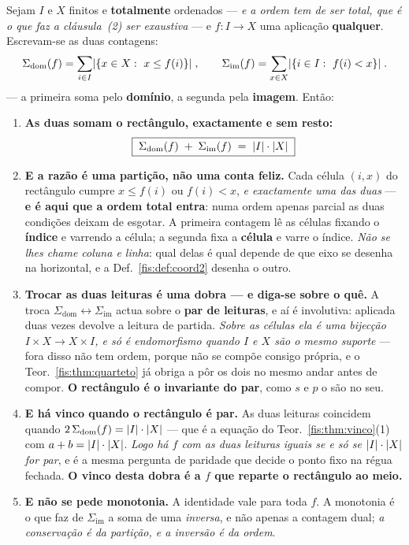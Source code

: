 \documentclass[livro.tex]{subfiles}
\begin{document}
\begin{teorema}\label{fis:thm:central}
Sejam $I$ e $X$ finitos e \textbf{totalmente} ordenados --- \emph{e a ordem tem
de ser total, que é o que faz a cláusula~(2) ser exaustiva} --- e
$f\colon I\to X$ uma aplicação \textbf{qualquer}. Escrevam-se as duas contagens:
\[
\Sigma_{\mathrm{dom}}(f)=\sum_{i\in I}\abs{\{x\in X:\ x\le f(i)\}}\;,
\qquad
\Sigma_{\mathrm{im}}(f)=\sum_{x\in X}\abs{\{i\in I:\ f(i)<x\}}\;.
\]
--- a primeira soma pelo \textbf{domínio}, a segunda pela \textbf{imagem}.
Então:
\begin{enumerate}\itemsep3pt
\item[(1)] \textbf{As duas somam o rectângulo, exactamente e sem resto:}
\[
\boxed{\;\Sigma_{\mathrm{dom}}(f)\;+\;\Sigma_{\mathrm{im}}(f)\;=\;\lvert I\rvert\cdot\lvert X\rvert\;}
\]
\item[(2)] \textbf{E a razão é uma partição, não uma conta feliz.} Cada célula
$(i,x)$ do rectângulo cumpre $x\le f(i)$ ou $f(i)<x$, \emph{e exactamente uma
das duas} --- \textbf{e é aqui que a ordem total entra}: numa ordem apenas
parcial as duas condições deixam de esgotar. A primeira contagem lê as células
fixando o \textbf{índice} e varrendo a célula; a segunda fixa a \textbf{célula} e
varre o índice. \emph{Não se lhes chame coluna e linha}: qual delas é qual depende
de que eixo se desenha na horizontal, e a Def.~\ref{fis:def:coord2} desenha o
outro.
\item[(3)] \textbf{Trocar as duas leituras é uma dobra --- e diga-se sobre o
quê.} A troca $\Sigma_{\mathrm{dom}}\leftrightarrow\Sigma_{\mathrm{im}}$ actua
sobre o \textbf{par de leituras}, e aí é involutiva: aplicada duas vezes devolve
a leitura de partida. \emph{Sobre as células ela é uma bijecção
$I\times X\to X\times I$, e só é endomorfismo quando $I$ e $X$ são o mesmo
suporte} --- fora disso não tem ordem, porque não se compõe consigo própria,
e o Teor.~\ref{fis:thm:quarteto} já obriga a pôr os dois no mesmo andar antes de
compor. \textbf{O rectângulo é o invariante do par}, como $s$ e $p$ o são no seu.
\item[(4)] \textbf{E há vinco quando o rectângulo é par.} As duas leituras
coincidem quando $2\,\Sigma_{\mathrm{dom}}(f)=\lvert I\rvert\cdot\lvert X\rvert$ --- que é a
equação do Teor.~\ref{fis:thm:vinco}(1) com $a+b=\lvert I\rvert\cdot\lvert X\rvert$. \emph{Logo
há $f$ com as duas leituras iguais se e só se $\lvert I\rvert\cdot\lvert X\rvert$ for par}, e é
a mesma pergunta de paridade que decide o ponto fixo na régua fechada. \textbf{O
vinco desta dobra é a $f$ que reparte o rectângulo ao meio.}
\item[(5)] \textbf{E não se pede monotonia.} A identidade vale para toda $f$. A
monotonia é o que faz de $\Sigma_{\mathrm{im}}$ a soma de uma \emph{inversa}, e
não apenas a contagem dual; \emph{a conservação é da partição, e a inversão é da
ordem}.
\end{enumerate}
\end{teorema}
\end{document}
